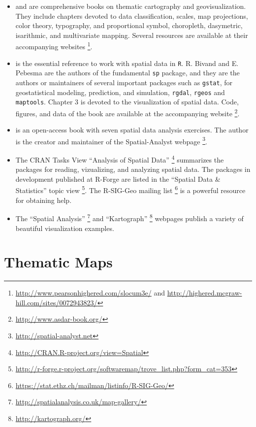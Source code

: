 \documentclass[smallroyalvopaper]{memoir}
\begin{document}
\begin{itemize}
\item \cite{Slocum.McMaster.ea2005} and \cite{Dent.Torguson.ea2008} are comprehensive books on thematic cartography and geovisualization.  They include chapters devoted to data classification, scales, map projections, color theory, typography, and proportional symbol, choropleth, dasymetric, isarithmic, and multivariate mapping. Several resources are available at their accompanying websites \footnote{\url{http://www.pearsonhighered.com/slocum3e/} and
\url{http://highered.mcgraw-hill.com/sites/0072943823/}}.

\item \cite{Bivand.Pebesma.ea2008} is the essential reference to work with spatial data in \texttt{R}. R. Bivand and E. Pebesma are the authors of the fundamental \texttt{sp} package, and they are the authors or maintainers of several important packages such as \texttt{gstat}, for geostatistical modeling, prediction, and simulation, \texttt{rgdal}, \texttt{rgeos} and \texttt{maptools}. Chapter 3 is devoted to the visualization of spatial data. Code, figures, and data of the book are available at the accompanying website \footnote{\url{http://www.asdar-book.org/}}.

\item \cite{Hengl2009} is an open-access book with seven spatial data analysis exercises. The author is the creator and maintainer of the Spatial-Analyst webpage \footnote{\url{http://spatial-analyst.net}}.

\item The CRAN Tasks View ``Analysis of Spatial Data'' \footnote{\url{http://CRAN.R-project.org/view=Spatial}} summarizes the packages for reading, vizualizing, and analyzing spatial data. The packages in development published at R-Forge are listed in the ``Spatial Data \& Statistics'' topic view \footnote{\url{http://r-forge.r-project.org/softwaremap/trove_list.php?form_cat=353}}. The R-SIG-Geo mailing list \footnote{\url{https://stat.ethz.ch/mailman/listinfo/R-SIG-Geo/}} is a powerful resource for obtaining help.

\item The ``Spatial Analysis'' \footnote{\url{http://spatialanalysis.co.uk/map-gallery/}} and ``Kartograph'' \footnote{\url{http://kartograph.org/}} webpages publish a variety of beautiful visualization examples.
\end{itemize}

\chapter{Thematic Maps}
\label{sec:orgheadline34}
\label{cha:thematicMaps}
\end{document}
